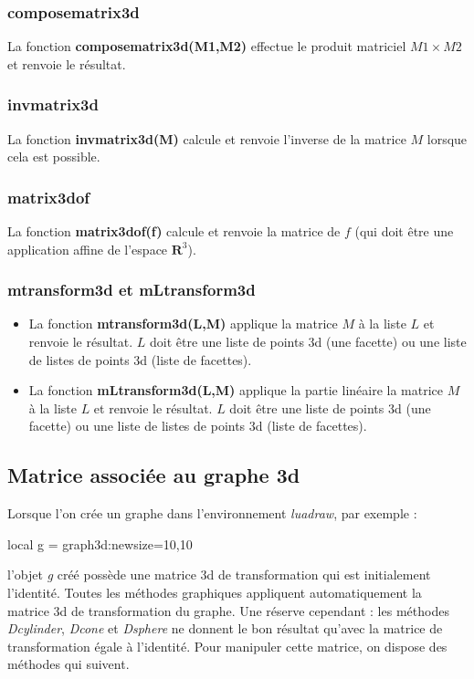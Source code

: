 \documentclass[%
10pt,%
a4paper,%
french,%
]%
{article}%
\begin{document}
\subsubsection{composematrix3d}
La fonction \textbf{composematrix3d(M1,M2)} effectue le produit matriciel $M1\times M2$ et renvoie le résultat.

\subsubsection{invmatrix3d}
La fonction \textbf{invmatrix3d(M)} calcule et renvoie l'inverse de la matrice $M$ lorsque cela est possible.

\subsubsection{matrix3dof}

La fonction \textbf{matrix3dof(f)} calcule et renvoie la matrice de $f$ (qui doit être une application affine de l'espace $\mathbf R^3$).


\subsubsection{mtransform3d et mLtransform3d}
\begin{itemize}
    \item La fonction \textbf{mtransform3d(L,M)} applique la matrice $M$ à la liste $L$ et renvoie le résultat. $L$ doit être une liste de points 3d (une facette) ou une liste de listes de points 3d (liste de facettes).
    \item La fonction \textbf{mLtransform3d(L,M)} applique la partie linéaire la matrice $M$ à la liste $L$ et renvoie le résultat. $L$ doit être une liste de points 3d (une facette) ou une liste de listes de points 3d (liste de facettes).
\end{itemize}

\subsection{Matrice associée au graphe 3d}

Lorsque l'on crée un graphe dans l'environnement \emph{luadraw}, par exemple :
\begin{Luacode}
local g = graph3d:new{size={10,10}}
\end{Luacode}
l'objet \emph{g} créé possède une matrice 3d de transformation qui est initialement l'identité. Toutes les méthodes graphiques appliquent automatiquement la matrice 3d de transformation du graphe. Une réserve cependant : les méthodes \emph{Dcylinder}, \emph{Dcone} et \emph{Dsphere} ne donnent le bon résultat qu'avec la matrice de transformation égale à l'identité. Pour manipuler cette matrice, on dispose des méthodes qui suivent.
\end{document}
